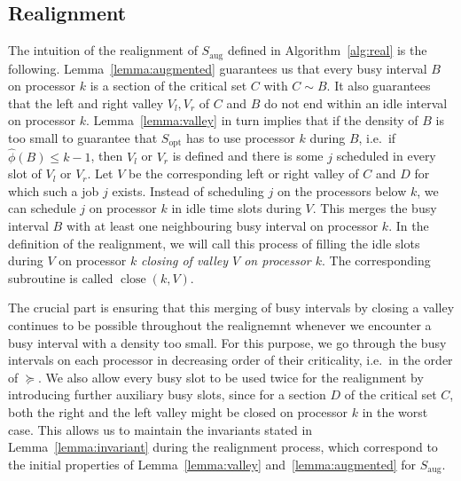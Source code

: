 \documentclass[a4paper]{article}
\DeclareMathOperator{\opt}{opt}
\DeclareMathOperator{\aug}{aug}
\DeclareMathOperator{\close}{close}
\begin{document}
\subsection{Realignment}\label{section:realignment}
The intuition of the realignment of $S_{\aug}$ defined in Algorithm~\ref{alg:real} is the following.
Lemma~\ref{lemma:augmented} guarantees us that every busy interval $B$ on processor $k$ is a section of the critical set $C$ with $C \sim B$.
It also guarantees that the left and right valley $V_l, V_r$ of $C$ and $B$ do not end within an idle interval on processor $k$.
Lemma~\ref{lemma:valley} in turn implies that if the density of $B$ is too small to guarantee that $S_{\opt}$ has to use processor $k$ during $B$, i.e.\ if $\hat \phi(B) \leq k - 1$, then $V_l$ or $V_r$ is defined and there is some $j$ scheduled in every slot of $V_l$ or $V_r$.
Let $V$ be the corresponding left or right valley of $C$ and $D$ for which such a job $j$ exists.
Instead of scheduling $j$ on the processors below $k$, we can schedule $j$ on processor $k$ in idle time slots during $V$.
This merges the busy interval $B$ with at least one neighbouring busy interval on processor $k$.
In the definition of the realignment, we will call this process of filling the idle slots during $V$ on processor $k$ \emph{closing of valley $V$ on processor $k$}.
The corresponding subroutine is called $\close(k, V)$.

The crucial part is ensuring that this merging of busy intervals by closing a valley continues to be possible throughout the realignemnt whenever we encounter a busy interval with a density too small.
For this purpose, we go through the busy intervals on each processor in decreasing order of their criticality, i.e.\ in the order of $\succeq$.
We also allow every busy slot to be used twice for the realignment by introducing further auxiliary busy slots, since for a section $D$ of the critical set $C$, both the right and the left valley might be closed on processor $k$ in the worst case.
This allows us to maintain the invariants stated in Lemma~\ref{lemma:invariant} during the realignment process, which correspond to the initial properties of Lemma~\ref{lemma:valley} and~\ref{lemma:augmented} for $S_{\aug}$.
\end{document}
